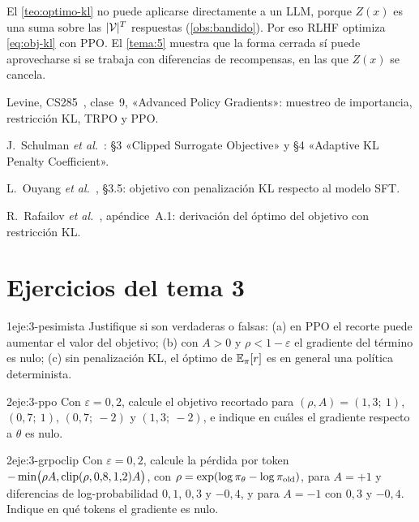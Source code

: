 El \cref{teo:optimo-kl} no puede aplicarse directamente a un LLM, porque $Z(x)$ es una suma sobre las $\lvert\mathcal{V}\rvert^{T}$ respuestas (\cref{obs:bandido}). Por eso RLHF optimiza \eqref{eq:obj-kl} con PPO. El \cref{tema:5} muestra que la forma cerrada sí puede aprovecharse si se trabaja con diferencias de recompensas, en las que $Z(x)$ se cancela.

\begin{lecturas}
\item Levine, CS285~\cite{cs285}, clase~9, «Advanced Policy Gradients»: muestreo de importancia, restricción KL, TRPO y PPO.
\item J.~Schulman \emph{et al.}~\cite{ppo}: §3 «Clipped Surrogate Objective» y §4 «Adaptive KL Penalty Coefficient».
\item L.~Ouyang \emph{et al.}~\cite{instructgpt}, §3.5: objetivo con penalización KL respecto al modelo SFT.
\item R.~Rafailov \emph{et al.}~\cite{dpo}, apéndice~A.1: derivación del óptimo del objetivo con restricción KL.
\end{lecturas}

\section*{Ejercicios del tema 3}

\begin{ejercicio}{1}{eje:3-pesimista}
Justifique si son verdaderas o falsas: (a) en PPO el recorte puede aumentar el valor del objetivo; (b) con $A>0$ y $\rho<1-\varepsilon$ el gradiente del término es nulo; (c) sin penalización KL, el óptimo de $\mathbb{E}_\pi[r]$ es en general una política determinista.
\end{ejercicio}

\begin{ejercicio}{2}{eje:3-ppo}
Con $\varepsilon=0{,}2$, calcule el objetivo recortado para $(\rho,A)=(1{,}3;\ 1)$, $(0{,}7;\ 1)$, $(0{,}7;\ -2)$ y $(1{,}3;\ -2)$, e indique en cuáles el gradiente respecto a $\theta$ es nulo.
\end{ejercicio}

\begin{ejercicio}{2}{eje:3-grpoclip}
Con $\varepsilon=0{,}2$, calcule la pérdida por token $-\min\bigl(\rho A,\operatorname{clip}(\rho,0{,}8,1{,}2)A\bigr)$, con $\rho=\exp(\log\pi_\theta-\log\pi_{\mathrm{old}})$, para $A=+1$ y diferencias de log-probabilidad $0{,}1$, $0{,}3$ y $-0{,}4$, y para $A=-1$ con $0{,}3$ y $-0{,}4$. Indique en qué tokens el gradiente es nulo.
\end{ejercicio}

